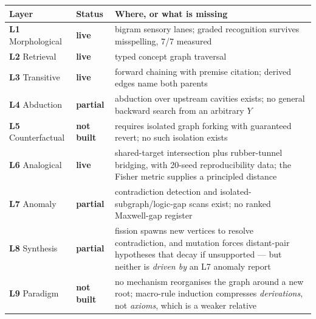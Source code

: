\documentclass[
  11pt,
  a4paper,
]{article}
\begin{document}
\begin{longtable}[]{@{}
  >{\raggedright\arraybackslash}p{}
  >{\raggedright\arraybackslash}p{}
  >{\raggedright\arraybackslash}p{}@{}}
\toprule\noalign{}
\begin{minipage}[b]{\linewidth}\raggedright
Layer
\end{minipage} & \begin{minipage}[b]{\linewidth}\raggedright
Status
\end{minipage} & \begin{minipage}[b]{\linewidth}\raggedright
Where, or what is missing
\end{minipage} \\
\midrule\noalign{}
\endhead
\bottomrule\noalign{}
\endlastfoot
\textbf{L1} Morphological & \textbf{live} & bigram sensory lanes; graded
recognition survives misspelling, 7/7 measured \\
\textbf{L2} Retrieval & \textbf{live} & typed concept graph traversal \\
\textbf{L3} Transitive & \textbf{live} & forward chaining with premise
citation; derived edges name both parents \\
\textbf{L4} Abduction & \textbf{partial} & abduction over upstream
cavities exists; no general backward search from an arbitrary \(Y\) \\
\textbf{L5} Counterfactual & \textbf{not built} & requires isolated
graph forking with guaranteed revert; no such isolation exists \\
\textbf{L6} Analogical & \textbf{live} & shared-target intersection plus
rubber-tunnel bridging, with 20-seed reproducibility data; the Fisher
metric supplies a principled distance \\
\textbf{L7} Anomaly & \textbf{partial} & contradiction detection and
isolated-subgraph/logic-gap scans exist; no ranked Maxwell-gap
register \\
\textbf{L8} Synthesis & \textbf{partial} & fission spawns new vertices
to resolve contradiction, and mutation forces distant-pair hypotheses
that decay if unsupported --- but neither is \emph{driven by} an L7
anomaly report \\
\textbf{L9} Paradigm & \textbf{not built} & no mechanism reorganises the
graph around a new root; macro-rule induction compresses
\emph{derivations}, not \emph{axioms}, which is a weaker relative \\
\end{longtable}
\end{document}
